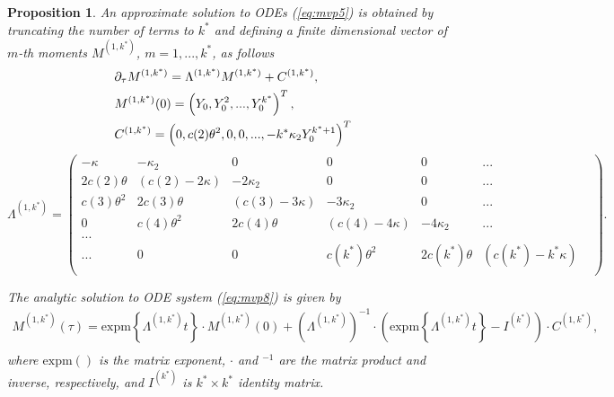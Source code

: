 \documentclass[pdftex,11pt,a4paper] {article}
\newtheorem{proposition}{Proposition}[section]
\begin{document}
\begin{proposition}
An approximate solution to ODEs (\ref{eq:mvp5}) is obtained by truncating the number of terms to $k^{*}$ and defining a finite dimensional vector of $m$-th moments $M^{(1,k^{*})}$, $m=1,...,k^{*}$, as follows
\begin{equation} \label {eq:mvp8}
\begin{split}
&\partial_{\tau}M^{(1,k^{*})} =\Lambda^{(1,k^{*})} M^{(1,k^{*})}+C^{(1,k^{*})},\\
&  M^{(1,k^{*})}(0)=\left(Y_{0}, Y^{2}_{0}, ... , Y^{k^{*}}_{0} \right)^{T}, \\ 
& C^{(1,k^{*})} = \left( 0, c(2)\theta^{2}, 0, 0, ..., - k^{*}\kappa_{2}Y^{k^{*}+1}_{0}\right)^{T}\vspace*{-1\baselineskip}
\end{split}
\end{equation}
\begin{equation*}
\Lambda^{(1,k^{*})} = \begin{pmatrix}
-\kappa & -\kappa_{2} &  0 & 0& 0& ... \\
 2c(2)\theta & (c(2)- 2\kappa) &  -2\kappa_{2} & 0& 0& ...\\
c(3)\theta^{2} & 2c(3)\theta & (c(3)- 3\kappa) &  - 3\kappa_{2} & 0& ...\\
0 & c(4)\theta^{2} & 2c(4)\theta & (c(4)- 4\kappa) &   -4\kappa_{2} & ...\\
...\\
... & 0 &  0 & c(k^{*})\theta^{2} & 2c(k^{*})\theta & (c(k^{*})- k^{*}\kappa) & \\
\end{pmatrix}.
\end{equation*}




The analytic solution to ODE system (\ref{eq:mvp8}) is given by
\begin{equation} \label {eq:mvp9}
\begin{split}
M^{(1,k^{*})}(\tau) = \text{expm}\left\{\Lambda^{(1,k^{*})} t \right\} \cdot M^{(1,k^{*})}(0)+\left(\Lambda^{(1,k^{*})}\right)^{-1}\cdot\left(\text{expm}\left\{\Lambda^{(1,k^{*})} t \right\}-I^{(k^{*})}\right)\cdot C^{(1,k^{*})},\\
\end{split}
\end{equation}
where $\text{expm}()$ is the matrix exponent, $\cdot$ and $^{-1}$ are the matrix product and inverse, respectively, and $I^{(k^{*})}$ is $k^{*}\times k^{*}$ identity matrix.

\end{proposition} 
\end{document}
